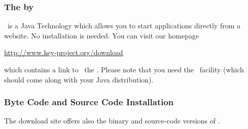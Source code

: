 \subsubsection{The \kp{} by \javaWS}
\label{install:javaws}

\javaWS\ is a Java Technology which allows you to start applications
directly from a website. No installation is needed. You can visit our
homepage
\begin{center}
  \url{http://www.key-project.org/download}
\end{center}
which contains a link to \javaWS\ the \kp.
%
Please note that you need the \javaWS\ facility
(which should come along with your Java distribution).

\subsubsection{Byte Code and Source Code Installation}
\label{install:byteandsourcecode}

The download site offers also the binary and source-code versions of
\KeY.

        
%
% 


